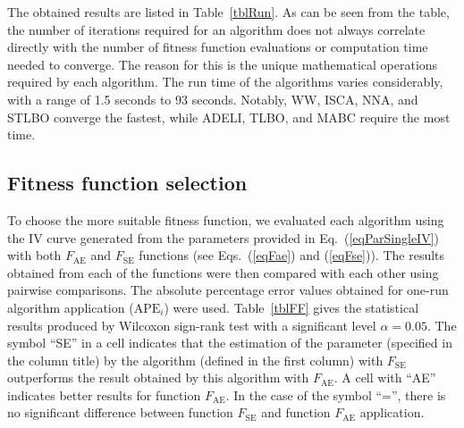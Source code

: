 \documentclass[a4paper,fleqn]{cas-sc}
\begin{document}
The obtained results are listed in Table~\ref{tblRun}.
As can be seen from the table, the number of iterations required for an algorithm does not always correlate directly
with the number of fitness function evaluations or computation time needed to converge.
The reason for this is the unique mathematical operations required by each algorithm.
The run time of the algorithms varies considerably, with a range of 1.5 seconds to 93 seconds.
Notably, WW, ISCA, NNA, and STLBO converge the fastest, while ADELI, TLBO, and MABC require the most time.

\subsection{Fitness function selection}

To choose the more suitable fitness function, we evaluated each algorithm using the IV curve generated from the parameters
provided in Eq.~(\ref{eqParSingleIV}) with both $F_\mathrm{AE}$ and $F_\mathrm{SE}$ functions (see Eqs.~(\ref{eqFae}) and (\ref{eqFse})).
The results obtained from each of the functions were then compared with each other using pairwise comparisons.
The absolute percentage error values obtained for one-run algorithm application ($\mathrm{APE}_i$) were used.
Table~\ref{tblFF} gives the statistical results produced by Wilcoxon sign-rank test with a significant level $\alpha = 0.05$.
The symbol ``SE'' in a cell indicates that the estimation of the parameter (specified in the column title)
by the algorithm (defined in the first column) with $F_\mathrm{SE}$ outperforms the result obtained by this algorithm with $F_\mathrm{AE}$.
A cell with ``AE'' indicates better results for function $F_\mathrm{AE}$.
In the case of the symbol ``='', there is no significant difference between function $F_\mathrm{SE}$ and function $F_\mathrm{AE}$ application.
\end{document}
